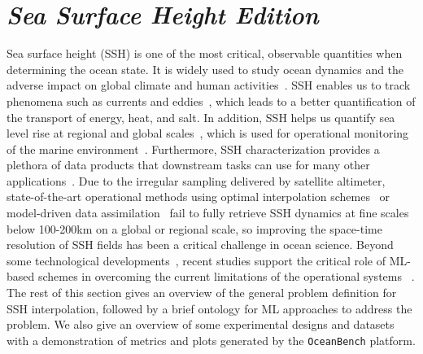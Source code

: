 \section{\textit{Sea Surface Height Edition}}\label{sec:interp_challenge}

Sea surface height (SSH) is one of the most critical, observable quantities when determining the ocean state. 
It is widely used to study ocean dynamics and the adverse impact on global climate and human activities~\cite{SSHMESOSCALE}. 
SSH enables us to track phenomena such as currents and eddies~\cite{SSHMESOSCALE,SSHMESOSCALE2,SSHMESOSCALE3}, which leads to a better quantification of the transport of energy, heat, and salt. 
In addition, SSH helps us quantify sea level rise at regional and global scales~\cite{SSHSEALEVEL,OCEANSEALEVEL}, which is used for operational monitoring of the marine environment~\cite{SSHOPERATIONAL}. 
Furthermore, SSH characterization provides a plethora of data products that downstream tasks can use for many other applications~\cite{SSH3DCIRCULATION, 3DQGOC}.
%
Due to the irregular sampling delivered by satellite altimeter, state-of-the-art operational methods using optimal interpolation schemes~\cite{DUACS, MIOST} or model-driven data assimilation~\cite{DINEOF, DINEOF2, ANALOGDA, ANALOGDA2} fail to fully retrieve SSH dynamics at fine scales below 100-200km on a global or regional scale, so improving the space-time resolution of SSH fields has been a critical challenge in ocean science. 
Beyond some technological developments~\cite{SWOT}, recent studies support the critical role of ML-based schemes in overcoming the current limitations of the operational systems~\cite{4DVARNETSWOT, BFNQG, SSHInterpAttention} .  
%
The rest of this section gives an overview of the general problem definition for SSH interpolation, followed by a brief ontology for ML approaches to address the problem. 
We also give an overview of some experimental designs and datasets with a demonstration of metrics and plots generated by the \texttt{OceanBench} platform. 









